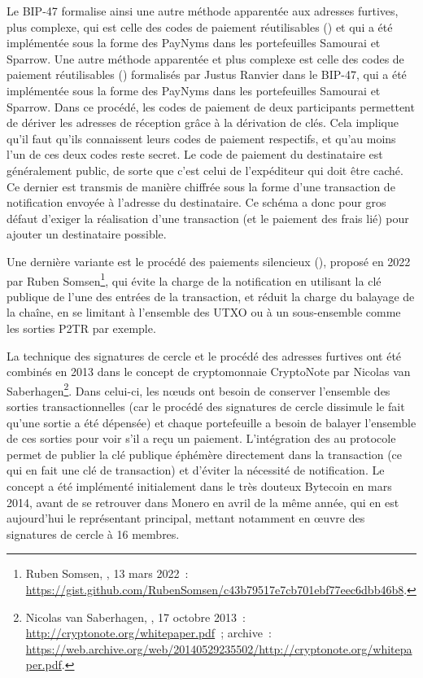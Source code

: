 Le BIP-47 formalise ainsi une autre méthode apparentée aux adresses furtives, plus complexe, qui est celle des codes de paiement réutilisables () et qui a été implémentée sous la forme des PayNyms dans les portefeuilles Samourai et Sparrow. Une autre méthode apparentée et plus complexe est celle des codes de paiement réutilisables () formalisés par Justus Ranvier dans le BIP-47, qui a été implémentée sous la forme des PayNyms dans les portefeuilles Samourai et Sparrow. Dans ce procédé, les codes de paiement de deux participants permettent de dériver les adresses de réception grâce à la dérivation de clés. Cela implique qu'il faut qu'ils connaissent leurs codes de paiement respectifs, et qu'au moins l'un de ces deux codes reste secret. Le code de paiement du destinataire est généralement public, de sorte que c'est celui de l'expéditeur qui doit être caché. Ce dernier est transmis de manière chiffrée sous la forme d'une transaction de notification envoyée à l'adresse du destinataire. Ce schéma a donc pour gros défaut d'exiger la réalisation d'une transaction (et le paiement des frais lié) pour ajouter un destinataire possible.

Une dernière variante est le procédé des paiements silencieux (), proposé en 2022 par Ruben Somsen\footnote{Ruben Somsen, , 13 mars 2022~: \url{https://gist.github.com/RubenSomsen/c43b79517e7cb701ebf77eec6dbb46b8}.}, qui évite la charge de la notification en utilisant la clé publique de l'une des entrées de la transaction, et réduit la charge du balayage de la chaîne, en se limitant à l'ensemble des UTXO ou à un sous-ensemble comme les sorties P2TR par exemple.

La technique des signatures de cercle et le procédé des adresses furtives ont été combinés en 2013 dans le concept de cryptomonnaie CryptoNote par Nicolas van Saberhagen\footnote{Nicolas van Saberhagen, , 17 octobre 2013~: \url{http://cryptonote.org/whitepaper.pdf}~; archive~: \url{https://web.archive.org/web/20140529235502/http://cryptonote.org/whitepaper.pdf}.}. Dans celui-ci, les nœuds ont besoin de conserver l'ensemble des sorties transactionnelles (car le procédé des signatures de cercle dissimule le fait qu'une sortie a été dépensée) et chaque portefeuille a besoin de balayer l'ensemble de ces sorties pour voir s'il a reçu un paiement. L'intégration des  au protocole permet de publier la clé publique éphémère directement dans la transaction (ce qui en fait une clé de transaction) et d'éviter la nécessité de notification. Le concept a été implémenté initialement dans le très douteux Bytecoin en mars 2014, avant de se retrouver dans Monero en avril de la même année, qui en est aujourd'hui le représentant principal, mettant notamment en œuvre des signatures de cercle à 16 membres.

